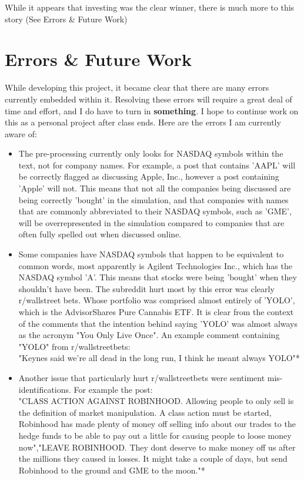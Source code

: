 \documentclass[11pt]{article}
\begin{document}
    While it appears that investing was the clear winner, there is much more to
    this story (See Errors \& Future Work)
\section{Errors \& Future Work}
    While developing this project, it became clear that there are many errors
    currently embedded within it. Resolving these errors will require a great
    deal of time and effort, and I do have to turn in \textbf{something}. I
    hope to continue work on this as a personal project after class ends. Here
    are the errors I am currently aware of:
    \begin{itemize}
	\item The pre-processing currently only looks for NASDAQ symbols
	    within the text, not for company names. For example, a post that
	    contains 'AAPL' will be correctly flagged as discussing Apple, Inc.,
	    however a post containing 'Apple' will not. This means that not all
	    the companies being discussed are being correctly 'bought' in the
	    simulation, and that companies with names that are commonly
	    abbreviated to their NASDAQ symbols, such as 'GME', will be
	    overrepresented in the simulation compared to companies that are
	    often fully spelled out when discussed online.
	\item Some companies have NASDAQ symbols that happen to be equivalent
	    to common words, most apparently is Agilent Technologies Inc.,
	    which has the NASDAQ symbol 'A'. This means that stocks were being
	    'bought' when they shouldn't have been. The subreddit hurt most by
	    this error was clearly r/wallstreet bets. Whose portfolio was
	    comprised almost entirely of 'YOLO', which is the AdvisorShares
	    Pure Cannabis ETF. It is clear from the context of the comments
	    that the intention behind saying 'YOLO' was almost always
	    as the acronym "You Only Live Once". An example comment containing
	    "YOLO" from r/wallstreetbets:\\

	    "Keynes said we're all dead in the long run, I think he meant
	    always YOLO"*
	\item Another issue that particularly hurt r/wallstreetbets were
	    sentiment mis-identifications. For example the post:\\

	    "CLASS ACTION AGAINST ROBINHOOD. Allowing people to only sell is
	    the definition of market manipulation. A class action must be
	    started, Robinhood has made plenty of money off selling info about
	    our trades to the hedge funds to be able to pay out a little for
	    causing people to loose money now","LEAVE ROBINHOOD. They dont
	    deserve to make money off us after the millions they caused in
	    losses. It might take a couple of days, but send Robinhood to the
	    ground and GME to the moon."*\\


\end{itemize}
\end{document}
